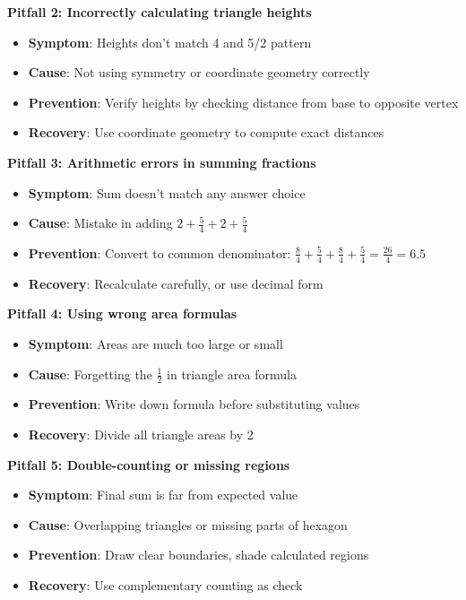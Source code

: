 \documentclass[11pt]{article}
\begin{document}
\begin{roadmapbox}
\textbf{Pitfall 2: Incorrectly calculating triangle heights}
\begin{itemize}
    \item \textbf{Symptom}: Heights don't match 4 and 5/2 pattern
    \item \textbf{Cause}: Not using symmetry or coordinate geometry correctly
    \item \textbf{Prevention}: Verify heights by checking distance from base to opposite vertex
    \item \textbf{Recovery}: Use coordinate geometry to compute exact distances
\end{itemize}

\textbf{Pitfall 3: Arithmetic errors in summing fractions}
\begin{itemize}
    \item \textbf{Symptom}: Sum doesn't match any answer choice
    \item \textbf{Cause}: Mistake in adding $2 + \frac{5}{4} + 2 + \frac{5}{4}$
    \item \textbf{Prevention}: Convert to common denominator: $\frac{8}{4} + \frac{5}{4} + \frac{8}{4} + \frac{5}{4} = \frac{26}{4} = 6.5$
    \item \textbf{Recovery}: Recalculate carefully, or use decimal form
\end{itemize}

\textbf{Pitfall 4: Using wrong area formulas}
\begin{itemize}
    \item \textbf{Symptom}: Areas are much too large or small
    \item \textbf{Cause}: Forgetting the $\frac{1}{2}$ in triangle area formula
    \item \textbf{Prevention}: Write down formula before substituting values
    \item \textbf{Recovery}: Divide all triangle areas by 2
\end{itemize}

\textbf{Pitfall 5: Double-counting or missing regions}
\begin{itemize}
    \item \textbf{Symptom}: Final sum is far from expected value
    \item \textbf{Cause}: Overlapping triangles or missing parts of hexagon
    \item \textbf{Prevention}: Draw clear boundaries, shade calculated regions
    \item \textbf{Recovery}: Use complementary counting as check
\end{itemize}
\end{roadmapbox}
\end{document}
